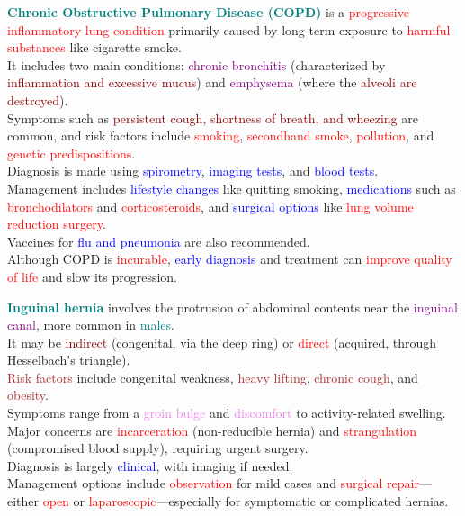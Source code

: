 \documentclass{article}
\begin{document}
\textcolor{teal}{\Large \bf Chronic Obstructive Pulmonary Disease (COPD)} is a \textcolor{red}{progressive inflammatory lung condition} primarily caused by long-term exposure to \textcolor{red}{harmful substances} like cigarette smoke.\\
It includes two main conditions: \textcolor{purple}{chronic bronchitis} (characterized by \textcolor{darkred}{inflammation and excessive mucus}) and \textcolor{purple}{emphysema} (where the \textcolor{darkred}{alveoli are destroyed}).\\
Symptoms such as \textcolor{darkred}{persistent cough, shortness of breath, and wheezing} are common, and risk factors include \textcolor{red}{smoking}, \textcolor{red}{secondhand smoke}, \textcolor{red}{pollution}, and \textcolor{red}{genetic predispositions}.\\
Diagnosis is made using \textcolor{blue}{spirometry}, \textcolor{blue}{imaging tests}, and \textcolor{blue}{blood tests}.\\
Management includes \textcolor{blue}{lifestyle changes} like quitting smoking, \textcolor{blue}{medications} such as \textcolor{red}{bronchodilators} and \textcolor{red}{corticosteroids}, and \textcolor{blue}{surgical options} like \textcolor{red}{lung volume reduction surgery}.\\
Vaccines for \textcolor{blue}{flu and pneumonia} are also recommended.\\
Although COPD is \textcolor{red}{incurable}, \textcolor{blue}{early diagnosis} and treatment can \textcolor{red}{improve quality of life} and slow its progression.

\bigskip

\textcolor{teal}{\Large \bf Inguinal hernia} involves the protrusion of abdominal contents near the \textcolor{purple}{inguinal canal}, more common in \textcolor{teal}{males}.\\
It may be \textcolor{darkred}{indirect} (congenital, via the deep ring) or \textcolor{red}{direct} (acquired, through Hesselbach’s triangle).\\
\textcolor{brown}{Risk factors} include congenital weakness, \textcolor{brown}{heavy lifting}, \textcolor{brown}{chronic cough}, and \textcolor{brown}{obesity}.\\
Symptoms range from a \textcolor{violet}{groin bulge} and \textcolor{violet}{discomfort} to activity-related swelling.\\
Major concerns are \textcolor{red}{incarceration} (non-reducible hernia) and \textcolor{red}{strangulation} (compromised blood supply), requiring urgent surgery.\\
Diagnosis is largely \textcolor{blue}{clinical}, with imaging if needed.\\
Management options include \textcolor{red}{observation} for mild cases and \textcolor{red}{surgical repair}—either \textcolor{red}{open} or \textcolor{red}{laparoscopic}—especially for symptomatic or complicated hernias.
\end{document}
